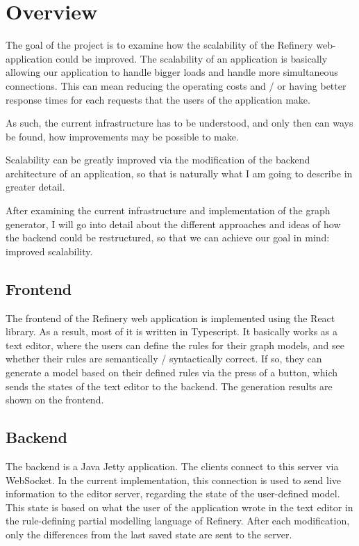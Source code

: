 \chapter{Overview} 
	\label{overview}
	The goal of the project is to examine how the scalability of the Refinery web-application could be improved. 
	The scalability of an application is basically allowing our application to handle bigger loads and handle more simultaneous connections.
	This can mean reducing the operating costs and / or having better response times for each requests that the users of the application make. 

	As such, the current
	infrastructure has to be understood, and only then can ways be found, how improvements may be possible to make.

	Scalability can be greatly improved via the modification of the backend architecture of an application, so that is naturally what
	I am going to describe in greater detail. 

	After examining the current infrastructure and implementation of the graph generator, 
	I will go into detail about the different approaches and ideas of how the backend could be restructured,
	so that we can achieve our goal in mind: improved scalability. 

\section{Frontend} \label{overviewfrontend}
	The frontend of the Refinery web application is implemented using the React library. As a result, most of it is written in Typescript.
	It basically works as a text editor, where the users can define the rules for their graph models, and see whether
	their rules are semantically / syntactically correct. If so, they can generate a model based on their defined rules
	via the press of a button, which sends the states of the text editor to the backend. The generation results 
	are shown on the frontend.

\section{Backend} \label{overviewbackend}
	The backend is a Java Jetty application. The clients connect to this server via WebSocket. 
	In the current implementation,
	this connection is used to send live information to the editor server, 
	regarding the state of the user-defined model.
	This state is based on what the user of the application wrote in the text editor in the
	rule-defining partial modelling language of Refinery. After each modification, only the differences
	from the last saved state are sent to the server.


